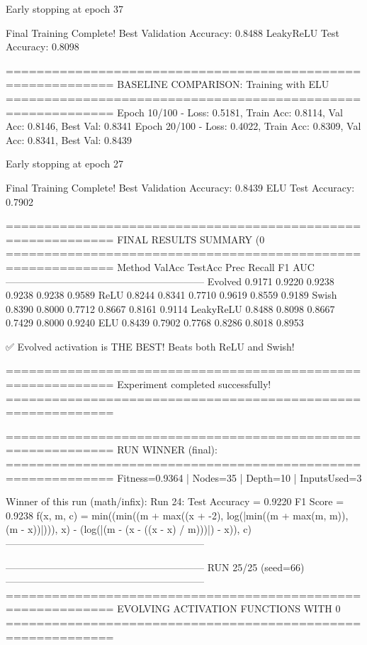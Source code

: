 Early stopping at epoch 37

Final Training Complete!
Best Validation Accuracy: 0.8488
LeakyReLU Test Accuracy: 0.8098

============================================================
BASELINE COMPARISON: Training with ELU
============================================================
Epoch  10/100 - Loss: 0.5181, Train Acc: 0.8114, Val Acc: 0.8146, Best Val: 0.8341
Epoch  20/100 - Loss: 0.4022, Train Acc: 0.8309, Val Acc: 0.8341, Best Val: 0.8439

Early stopping at epoch 27

Final Training Complete!
Best Validation Accuracy: 0.8439
ELU Test Accuracy: 0.7902

============================================================
FINAL RESULTS SUMMARY (0%
============================================================
Method             ValAcc     TestAcc    Prec       Recall     F1         AUC
------------------------------------------------------------
Evolved            0.9171     0.9220     0.9238     0.9238     0.9238     0.9589
ReLU               0.8244     0.8341     0.7710     0.9619     0.8559     0.9189
Swish              0.8390     0.8000     0.7712     0.8667     0.8161     0.9114
LeakyReLU          0.8488     0.8098     0.8667     0.7429     0.8000     0.9240
ELU                0.8439     0.7902     0.7768     0.8286     0.8018     0.8953

✅ Evolved activation is THE BEST! Beats both ReLU and Swish!

============================================================
Experiment completed successfully!
============================================================

============================================================
RUN WINNER (final):
============================================================
Fitness=0.9364 | Nodes=35 | Depth=10 | InputsUsed=3

Winner of this run (math/infix):
  Run 24:
     Test Accuracy = 0.9220
     F1 Score      = 0.9238
     f(x, m, c)    = min((min((m + max((x + -2), log(|min((m + max(m, m)), (m - x))|))), x) - (log(|(m - (x - ((x - x) / m)))|) - x)), c)
------------------------------------------------------------

------------------------------------------------------------
RUN 25/25 (seed=66)
------------------------------------------------------------
============================================================
EVOLVING ACTIVATION FUNCTIONS
WITH 0%
============================================================

